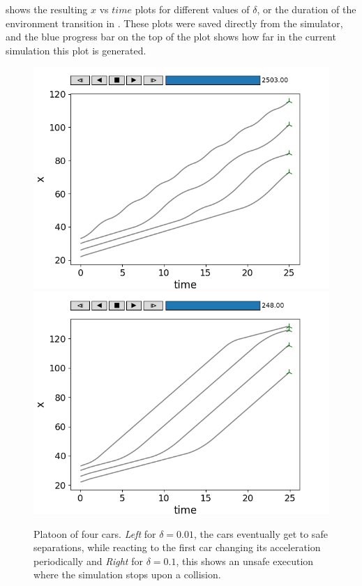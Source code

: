 
 shows the resulting $x$ vs $\mathit{time}$ plots for different values of $\delta$, or the duration of the environment transition in . These plots were saved directly from the simulator, and the blue progress bar on the top of the plot shows how far in the current simulation this plot is generated.

\begin{figure}[ht!]
\begin{minipage}{0.5\textwidth}
\includegraphics[width=.5\textwidth]{figs/braking_acc.png}\hfill
\includegraphics[width=.5\textwidth]{figs/braking_bad.png}
\end{minipage}%
	\caption{\small {Platoon of four cars. \emph{Left} for $\delta = 0.01$, the cars eventually get to safe separations, while reacting to the first car changing its acceleration periodically} and \emph{Right} for $\delta = 0.1$, this shows an unsafe execution where the simulation stops upon a collision.}
\label{fig:platoon}
\end{figure}

